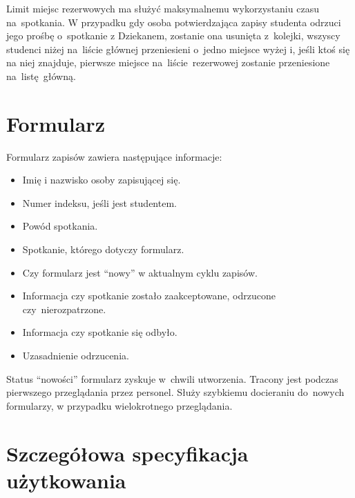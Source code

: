 \documentclass[licencjacka]{pracamgr}
\begin{document}
Limit miejsc rezerwowych ma służyć maksymalnemu wykorzystaniu czasu na~spotkania. W przypadku gdy osoba potwierdzająca zapisy studenta odrzuci jego prośbę o~spotkanie z Dziekanem, zostanie ona usunięta z~kolejki, wszyscy studenci niżej na~liście głównej przeniesieni o~jedno miejsce wyżej i, jeśli ktoś się na niej znajduje, pierwsze miejsce na~liście~rezerwowej zostanie przeniesione na~listę~główną.


\section{Formularz}
Formularz zapisów zawiera następujące informacje:

\begin{itemize}
\setlength\itemsep{0,05em}
    \item Imię i nazwisko osoby zapisującej się.
    \item Numer indeksu, jeśli jest studentem.
    \item Powód spotkania.
    \item Spotkanie, którego dotyczy formularz.
    \item Czy formularz jest “nowy” w aktualnym cyklu zapisów.
    \item Informacja czy spotkanie zostało zaakceptowane, odrzucone czy~nierozpatrzone.
    \item Informacja czy spotkanie się odbyło.
    \item Uzasadnienie odrzucenia.
\end{itemize}
Status \enquote{nowości} formularz zyskuje w~chwili utworzenia. Tracony jest podczas pierwszego przeglądania przez personel. Służy szybkiemu docieraniu do~nowych formularzy, w przypadku wielokrotnego przeglądania.

\section{Szczegółowa specyfikacja użytkowania}
\end{document}
